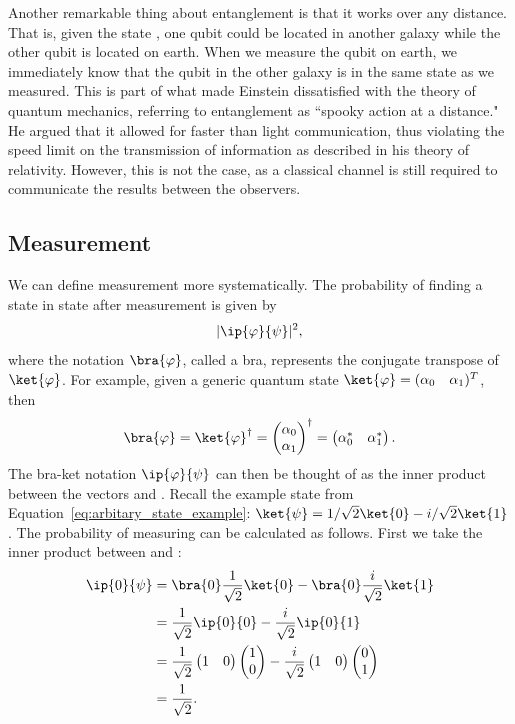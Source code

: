 \documentclass[a4paper,10pt]{article}
\newcommand{\qstatezero}{
	\begin{pmatrix}1 \\ 0\end{pmatrix}
}
\newcommand{\qstateone}{
	\begin{pmatrix}0 \\ 1\end{pmatrix}
}
\begin{document}
Another remarkable thing about entanglement is that it works over any distance.
That is, given the state \ket{\Phi^+}, one qubit could be located in another galaxy while the other qubit is located on earth.
When we measure the qubit on earth, we immediately know that the qubit in the other galaxy is in the same state as we measured.
This is part of what made Einstein dissatisfied with the theory of quantum mechanics, referring to entanglement as ``spooky action at a distance."
He argued that it allowed for faster than light communication, thus violating the speed limit on the transmission of information as described in his theory of relativity.
However, this is not the case, as a classical channel is still required to communicate the results between the observers.

\subsection{Measurement}
We can define measurement more systematically.
The probability of finding a state \ket{\psi} in state \ket{\varphi} after measurement is given by
\begin{equation}
\lvert\ip{\varphi}{\psi}\rvert^2,
\end{equation}
where the notation $\bra{\varphi}$, called a bra, represents the conjugate transpose of $\ket{\varphi}$.
For example, given a generic quantum state $\ket{\varphi} = (\begin{matrix}\alpha_0 & \alpha_1\end{matrix})^T$, then 
\begin{equation}
\bra{\varphi} = \ket{\varphi}^\dagger = \begin{pmatrix}\alpha_0 \\ \alpha_1\end{pmatrix}^\dagger =  \begin{pmatrix}\alpha_0^* & \alpha_1^*\end{pmatrix}.
\end{equation}
The bra-ket notation $\ip{\varphi}{\psi}$ can then be thought of as the inner product between the vectors \ket{\varphi} and \ket{\psi}.
Recall the example state from Equation~\ref{eq:arbitary_state_example}: $\ket{\psi} = 1/\sqrt2\ket{0} - i/\sqrt2\ket{1}$.
The probability of measuring  can be calculated as follows.
First we take the inner product between  and \ket{\psi}:
\begin{equation}
\begin{aligned}
\ip{0}{\psi} &= \bra{0}\dfrac{1}{\sqrt2}\ket{0} - \bra{0}\dfrac{i}{\sqrt2}\ket{1} \\
&= \dfrac{1}{\sqrt2}\ip{0}{0} - \dfrac{i}{\sqrt2}\ip{0}{1} \\
&= \dfrac{1}{\sqrt2}\begin{pmatrix}1 & 0\end{pmatrix} \qstatezero - \dfrac{i}{\sqrt2}\begin{pmatrix}1 & 0\end{pmatrix} \qstateone \\
&= \dfrac{1}{\sqrt2}. \\
\end{aligned}
\end{equation}
\end{document}

